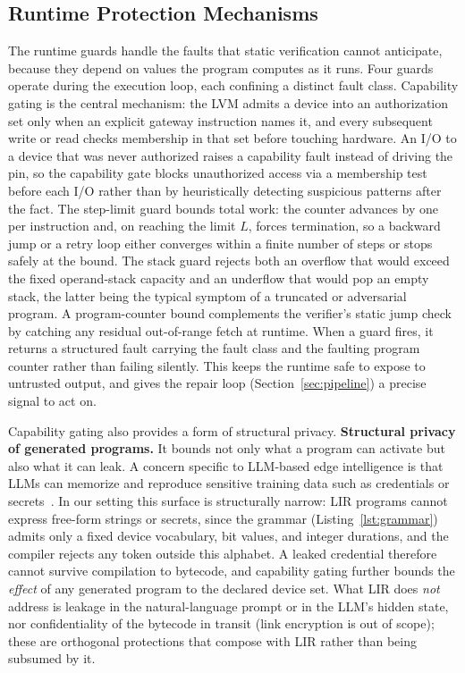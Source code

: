 \documentclass[a4paper,fleqn,longmktitle]{cas-dc}
\begin{document}
\subsection{Runtime Protection Mechanisms}
\label{sec:safety}

The runtime guards handle the faults that static verification cannot anticipate, because they depend on values the program computes as it runs. Four guards operate during the execution loop, each confining a distinct fault class. Capability gating is the central mechanism: the LVM admits a device into an authorization set only when an explicit gateway instruction names it, and every subsequent write or read checks membership in that set before touching hardware. An I/O to a device that was never authorized raises a capability fault instead of driving the pin, so the capability gate blocks unauthorized access via a membership test before each I/O rather than by heuristically detecting suspicious patterns after the fact. The step-limit guard bounds total work: the counter advances by one per instruction and, on reaching the limit $L$, forces termination, so a backward jump or a retry loop either converges within a finite number of steps or stops safely at the bound. The stack guard rejects both an overflow that would exceed the fixed operand-stack capacity and an underflow that would pop an empty stack, the latter being the typical symptom of a truncated or adversarial program. A program-counter bound complements the verifier's static jump check by catching any residual out-of-range fetch at runtime. When a guard fires, it returns a structured fault carrying the fault class and the faulting program counter rather than failing silently. This keeps the runtime safe to expose to untrusted output, and gives the repair loop (Section~\ref{sec:pipeline}) a precise signal to act on.

Capability gating also provides a form of structural privacy. \textbf{Structural privacy of generated programs.} It bounds not only what a program can activate but also what it can leak. A concern specific to LLM-based edge intelligence is that LLMs can memorize and reproduce sensitive training data such as credentials or secrets~\citep{carlini2021extracting}. In our setting this surface is structurally narrow: LIR programs cannot express free-form strings or secrets, since the grammar (Listing~\ref{lst:grammar}) admits only a fixed device vocabulary, bit values, and integer durations, and the compiler rejects any token outside this alphabet. A leaked credential therefore cannot survive compilation to bytecode, and capability gating further bounds the \emph{effect} of any generated program to the declared device set. What LIR does \emph{not} address is leakage in the natural-language prompt or in the LLM's hidden state, nor confidentiality of the bytecode in transit (link encryption is out of scope); these are orthogonal protections that compose with LIR rather than being subsumed by it.
\end{document}
